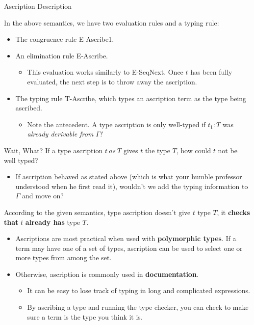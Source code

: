 \documentclass[11pt]{beamer}
\begin{document}
\begin{frame}[fragile=singleslide]{Ascription Description}

In the above semantics, we have two evaluation rules and a typing rule:
\begin{itemize}
\item The congruence rule E-Ascribe1.
\item An elimination rule E-Ascribe.
\begin{itemize}
\item This evaluation works similarly to E-SeqNext.  Once $t$ has been fully evaluated, the next step is to throw away the ascription.  
\end{itemize}
\item The typing rule T-Ascribe, which types an ascription term as the type being ascribed.
\begin{itemize}
\item Note the antecedent.  A type ascription is only well-typed if $t_1 : T$ was \emph{already derivable from $\Gamma$!}
\end{itemize}
\end{itemize}
\end{frame}


\begin{frame}[fragile=singleslide]{Wait, What?}
If a type ascription $t\:as\:T$ gives $t$ the type $T$, how could $t$ not be well typed?
\begin{itemize}
\item If ascription behaved as stated above (which is what your humble professor understood when he first read it), wouldn't we add the typing information to $\Gamma$ and move on? 
\end{itemize}
According to the given semantics, type ascription doesn't give $t$ type $T$, it \textbf{checks that} $t$ \textbf{already has} type $T$. 
\begin{itemize}
\item Ascriptions are most practical when used with \textbf{polymorphic types}.  If a term may have one of a set of types, ascription can be used to select one or more types from among the set.
\item Otherwise, ascription is commonly used in \textbf{documentation}.  
\begin{itemize}
\item It can be easy to lose track of typing in long and complicated expressions.  
\item By ascribing a type and running the type checker, you can check to make sure a term is the type you think it is.  
\end{itemize}
\end{itemize}
\end{frame}
\end{document}
